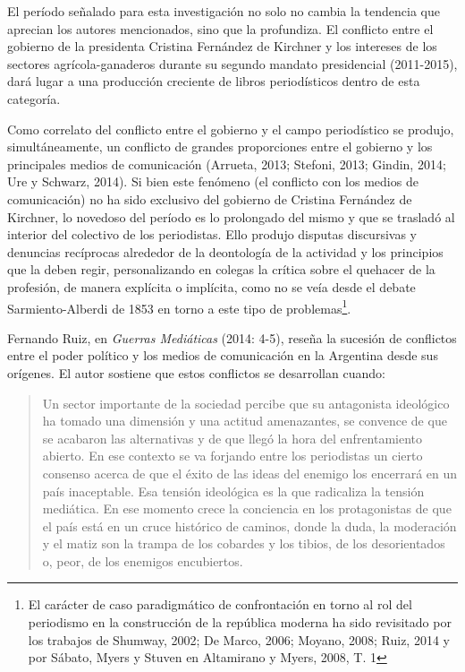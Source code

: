 El período señalado para esta investigación no solo no cambia la tendencia que aprecian los autores mencionados, sino que la profundiza. El conflicto entre el gobierno de la presidenta Cristina Fernández de Kirchner y los intereses de los sectores agrícola-ganaderos durante su segundo mandato presidencial (2011-2015), dará lugar a una producción creciente de libros periodísticos dentro de esta categoría.

Como correlato del conflicto entre el gobierno y el campo periodístico se produjo, simultáneamente, un conflicto de grandes proporciones entre el gobierno y los principales medios de comunicación (Arrueta, 2013; Stefoni, 2013; Gindin, 2014; Ure y Schwarz, 2014). Si bien este fenómeno (el conflicto con los medios de comunicación) no ha sido exclusivo del gobierno de Cristina Fernández de Kirchner, lo novedoso del período es lo prolongado del mismo y que se trasladó al interior del colectivo de los periodistas. Ello produjo disputas discursivas y denuncias recíprocas alrededor de la deontología de la actividad y los principios que la deben regir, personalizando en colegas la crítica sobre el quehacer de la profesión, de manera explícita o implícita, como no se veía desde el debate Sarmiento-Alberdi de 1853 en torno a este tipo de problemas\footnote{El carácter de caso paradigmático de confrontación en torno al rol del periodismo en la construcción de la república moderna ha sido revisitado por los trabajos de Shumway, 2002; De Marco, 2006; Moyano, 2008; Ruiz, 2014 y por Sábato, Myers y Stuven en Altamirano y Myers, 2008, T. 1}.

Fernando Ruiz, en \emph{Guerras Mediáticas} (2014: 4-5), reseña la sucesión de conflictos entre el poder político y los medios de comunicación en la Argentina desde sus orígenes. El autor sostiene que estos conflictos se desarrollan cuando:

\begin{quote}
Un sector importante de la sociedad percibe que su antagonista ideológico ha tomado una dimensión y una actitud amenazantes, se convence de que se acabaron las alternativas y de que llegó la hora del enfrentamiento abierto. En ese contexto se va forjando entre los periodistas un cierto consenso acerca de que el éxito de las ideas del enemigo los encerrará en un país inaceptable. Esa tensión ideológica es la que radicaliza la tensión mediática. En ese momento crece la conciencia en los protagonistas de que el país está en un cruce histórico de caminos, donde la duda, la moderación y el matiz son la trampa de los cobardes y los tibios, de los desorientados o, peor, de los enemigos encubiertos.
\end{quote}


